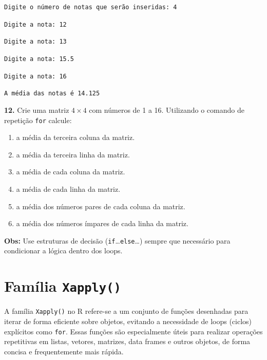 \documentclass[
]{book}
\begin{document}
\texttt{Digite\ o\ número\ de\ notas\ que\ serão\ inseridas:\ 4}

\texttt{Digite\ a\ nota:\ 12}

\texttt{Digite\ a\ nota:\ 13}

\texttt{Digite\ a\ nota:\ 15.5}

\texttt{Digite\ a\ nota:\ 16}

\texttt{A\ média\ das\ notas\ é\ 14.125}

\textbf{12.} Crie uma matriz \(4\times4\) com números de 1 a 16. Utilizando o
comando de repetição \texttt{for} calcule:

\begin{enumerate}
\def\labelenumi{(\alph{enumi})}
\item
  a média da terceira coluna da matriz.
\item
  a média da terceira linha da matriz.
\item
  a média de cada coluna da matriz.
\item
  a média de cada linha da matriz.
\item
  a média dos números pares de cada coluna da matriz.
\item
  a média dos números ímpares de cada linha da matriz.
\end{enumerate}

\textbf{Obs:} Use estruturas de decisão (\texttt{if}\ldots{}\texttt{else}\ldots) sempre que
necessário para condicionar a lógica dentro dos loops.

\chapter{\texorpdfstring{Família \texttt{Xapply()}}{Família Xapply()}}\label{famuxedlia-xapply}

A família \texttt{Xapply()} no R refere-se a um conjunto de funções desenhadas
para iterar de forma eficiente sobre objetos, evitando a necessidade de
loops (ciclos) explícitos como \texttt{for}. Essas funções são especialmente
úteis para realizar operações repetitivas em listas, vetores, matrizes,
data frames e outros objetos, de forma concisa e frequentemente mais
rápida.
\end{document}
